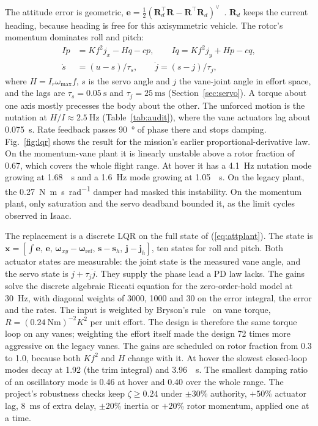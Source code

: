 \documentclass[journal]{IEEEtran}
\newcommand{\refeq}[1]{(\ref{#1})}
\newcommand{\reffig}[1]{Fig.~\ref{#1}}
\newcommand{\refsec}[1]{Section~\ref{#1}}
\newcommand{\reftab}[1]{Table~\ref{#1}}
\newcommand{\vect}[1]{\bm{#1}}
\newcommand{\mat}[1]{\mathbf{#1}}
\newcommand{\Ir}{I_r}
\newcommand{\wmax}{\omega_{\max}}
\begin{document}
The attitude error is geometric, $\vect{e} = \tfrac12(\mat{R}_d^\top\mat{R} - \mat{R}^\top\mat{R}_d)^\vee$~\cite{lee2010geometric}.
$\mat{R}_d$ keeps the current heading, because heading is free for this axisymmetric vehicle.
The rotor's momentum dominates roll and pitch:
\begin{equation}
\begin{split}
I\dot p &= Kf^2 j_x - Hq - cp, \qquad I\dot q = Kf^2 j_y + Hp - cq,\\
\dot s &= (u - s)/\tau_s, \qquad \dot j = (s - j)/\tau_j ,
\end{split}
\label{eq:attplant}
\end{equation}
where $H = \Ir\wmax f$, $s$ is the servo angle and $j$ the vane-joint angle in effort space, and the lags are $\tau_s = \SI{0.05}{\second}$ and $\tau_j = \SI{25}{\milli\second}$ (\refsec{sec:servo}).
A torque about one axis mostly precesses the body about the other.
The unforced motion is the nutation at $H/I \approx \SI{2.5}{\hertz}$ (\reftab{tab:audit}), where the vane actuators lag about \SI{0.075}{\second}.
Rate feedback passes \SI{90}{\degree} of phase there and stops damping.
\reffig{fig:lqr} shows the result for the mission's earlier proportional-derivative law.
On the momentum-vane plant it is linearly unstable above a rotor fraction of 0.67, which covers the whole flight range.
At hover it has a \SI{4.1}{\hertz} nutation mode growing at \SI{1.68}{\per\second} and a \SI{1.6}{\hertz} mode growing at \SI{1.05}{\per\second}.
On the legacy plant, the \SI{0.27}{\newton\metre\second\per\radian} damper had masked this instability.
On the momentum plant, only saturation and the servo deadband bounded it, as the limit cycles observed in Isaac.

The replacement is a discrete LQR on the full state of \refeq{eq:attplant}.
The state is $\vect{x} = [\int\vect{e},\, \vect{e},\, \vect{\omega}_{xy} - \vect{\omega}_{\text{ref}},\, \vect{s} - \vect{s}_h,\, \vect{j} - \vect{j}_h]$, ten states for roll and pitch.
Both actuator states are measurable: the joint state is the measured vane angle, and the servo state is $j + \tau_j\dot j$.
They supply the phase lead a PD law lacks.
The gains solve the discrete algebraic Riccati equation for the zero-order-hold model at \SI{30}{\hertz}, with diagonal weights of 3000, 1000 and 30 on the error integral, the error and the rates.
The input is weighted by Bryson's rule~\cite{bryson1975} on vane torque, $R = (\SI{0.24}{\newton\metre})^{-2}K^2$ per unit effort.
The design is therefore the same torque loop on any vanes; weighting the effort itself made the design 72 times more aggressive on the legacy vanes.
The gains are scheduled on rotor fraction from 0.3 to 1.0, because both $Kf^2$ and $H$ change with it.
At hover the slowest closed-loop modes decay at 1.92 (the trim integral) and \SI{3.96}{\per\second}.
The smallest damping ratio of an oscillatory mode is 0.46 at hover and 0.40 over the whole range.
The project's robustness checks keep $\zeta \ge 0.24$ under $\pm30\%$ authority, $+50\%$ actuator lag, \SI{8}{\milli\second} of extra delay, $\pm20\%$ inertia or $+20\%$ rotor momentum, applied one at a time.
\end{document}

